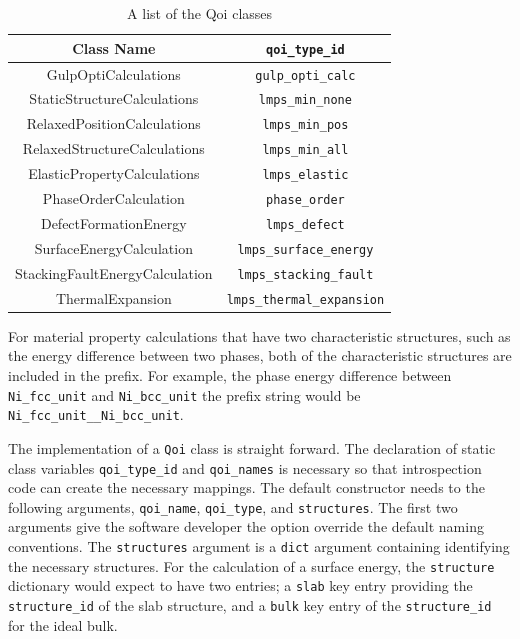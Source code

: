 \begin{table}[ht]
	\centering
	\caption{A list of the Qoi classes}
	\label{tbl:pypospack_qoi_classes}
	\begin{tabular}{cc}
		\hline
		Class Name
		  & \verb|qoi_type_id| \\
		\hline
    GulpOptiCalculations
		   & \verb|gulp_opti_calc| \\
		StaticStructureCalculations
		   & \verb|lmps_min_none| \\
		RelaxedPositionCalculations
		   & \verb|lmps_min_pos| \\
		RelaxedStructureCalculations
		   & \verb|lmps_min_all| \\
    ElasticPropertyCalculations
		   & \verb|lmps_elastic| \\
		PhaseOrderCalculation
		   & \verb|phase_order| \\
		DefectFormationEnergy
		   & \verb|lmps_defect| \\
		SurfaceEnergyCalculation
		   & \verb|lmps_surface_energy|  \\
		StackingFaultEnergyCalculation
			 & \verb|lmps_stacking_fault| \\
		ThermalExpansion
			 & \verb|lmps_thermal_expansion| \\
		\hline
	\end{tabular}
\end{table}


For material property calculations that have two characteristic structures, such as the energy difference between two phases, both of the characteristic structures are included in the prefix.  For example, the phase energy difference between \verb|Ni_fcc_unit| and \verb|Ni_bcc_unit| the prefix string would be \verb|Ni_fcc_unit__Ni_bcc_unit|.

The implementation of a \verb|Qoi| class is straight forward.  The declaration of static class variables \verb|qoi_type_id| and \verb|qoi_names| is necessary so that introspection code can create the necessary mappings.   The default constructor needs to the following arguments, \verb|qoi_name|, \verb|qoi_type|, and \verb|structures|.   The first two arguments give the software developer the option override the default naming conventions.  The \verb|structures| argument is a \verb|dict| argument containing identifying the necessary structures.  For the calculation of a surface energy, the \verb|structure| dictionary would expect to have two entries; a \verb|slab| key entry providing the \verb|structure_id| of the slab structure, and a \verb|bulk| key entry of the \verb|structure_id| for the ideal bulk.

